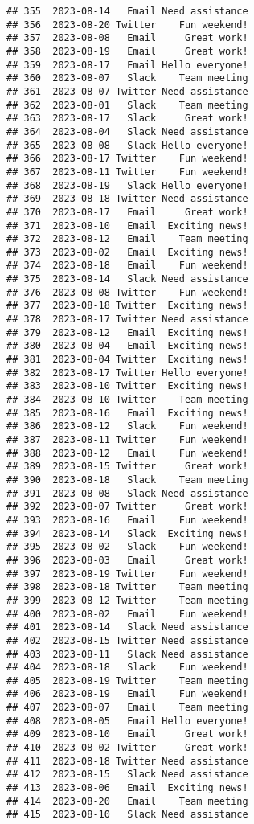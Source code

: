 \documentclass[
]{article}
\begin{document}
\begin{verbatim}
## 355  2023-08-14   Email Need assistance
## 356  2023-08-20 Twitter    Fun weekend!
## 357  2023-08-08   Email     Great work!
## 358  2023-08-19   Email     Great work!
## 359  2023-08-17   Email Hello everyone!
## 360  2023-08-07   Slack    Team meeting
## 361  2023-08-07 Twitter Need assistance
## 362  2023-08-01   Slack    Team meeting
## 363  2023-08-17   Slack     Great work!
## 364  2023-08-04   Slack Need assistance
## 365  2023-08-08   Slack Hello everyone!
## 366  2023-08-17 Twitter    Fun weekend!
## 367  2023-08-11 Twitter    Fun weekend!
## 368  2023-08-19   Slack Hello everyone!
## 369  2023-08-18 Twitter Need assistance
## 370  2023-08-17   Email     Great work!
## 371  2023-08-10   Email  Exciting news!
## 372  2023-08-12   Email    Team meeting
## 373  2023-08-02   Email  Exciting news!
## 374  2023-08-18   Email    Fun weekend!
## 375  2023-08-14   Slack Need assistance
## 376  2023-08-08 Twitter    Fun weekend!
## 377  2023-08-18 Twitter  Exciting news!
## 378  2023-08-17 Twitter Need assistance
## 379  2023-08-12   Email  Exciting news!
## 380  2023-08-04   Email  Exciting news!
## 381  2023-08-04 Twitter  Exciting news!
## 382  2023-08-17 Twitter Hello everyone!
## 383  2023-08-10 Twitter  Exciting news!
## 384  2023-08-10 Twitter    Team meeting
## 385  2023-08-16   Email  Exciting news!
## 386  2023-08-12   Slack    Fun weekend!
## 387  2023-08-11 Twitter    Fun weekend!
## 388  2023-08-12   Email    Fun weekend!
## 389  2023-08-15 Twitter     Great work!
## 390  2023-08-18   Slack    Team meeting
## 391  2023-08-08   Slack Need assistance
## 392  2023-08-07 Twitter     Great work!
## 393  2023-08-16   Email    Fun weekend!
## 394  2023-08-14   Slack  Exciting news!
## 395  2023-08-02   Slack    Fun weekend!
## 396  2023-08-03   Email     Great work!
## 397  2023-08-19 Twitter    Fun weekend!
## 398  2023-08-18 Twitter    Team meeting
## 399  2023-08-12 Twitter    Team meeting
## 400  2023-08-02   Email    Fun weekend!
## 401  2023-08-14   Slack Need assistance
## 402  2023-08-15 Twitter Need assistance
## 403  2023-08-11   Slack Need assistance
## 404  2023-08-18   Slack    Fun weekend!
## 405  2023-08-19 Twitter    Team meeting
## 406  2023-08-19   Email    Fun weekend!
## 407  2023-08-07   Email    Team meeting
## 408  2023-08-05   Email Hello everyone!
## 409  2023-08-10   Email     Great work!
## 410  2023-08-02 Twitter     Great work!
## 411  2023-08-18 Twitter Need assistance
## 412  2023-08-15   Slack Need assistance
## 413  2023-08-06   Email  Exciting news!
## 414  2023-08-20   Email    Team meeting
## 415  2023-08-10   Slack Need assistance

\end{verbatim}
\end{document}
